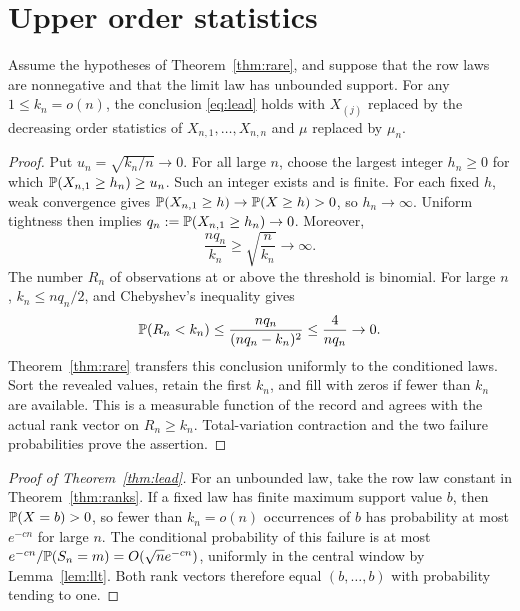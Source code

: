 \section{Upper order statistics}\label{sec:ranks}
\begin{theorem}\label{thm:ranks}
Assume the hypotheses of Theorem~\ref{thm:rare}, and suppose that the row laws are nonnegative and that the limit law has unbounded support. For any $1\le k_n=o(n)$, the conclusion \eqref{eq:lead} holds with $X_{(j)}$ replaced by the decreasing order statistics of $X_{n,1},\ldots,X_{n,n}$ and $\mu$ replaced by $\mu_n$.
\end{theorem}
\begin{proof}
Put $u_n=\sqrt{k_n/n}\to0$. For all large $n$, choose the largest integer $h_n\ge0$ for which $\mathbb P(X_{n,1}\ge h_n)\ge u_n$. Such an integer exists and is finite. For each fixed $h$, weak convergence gives $\mathbb P(X_{n,1}\ge h)\to\mathbb P(X\ge h)>0$, so $h_n\to\infty$. Uniform tightness then implies $q_n:=\mathbb P(X_{n,1}\ge h_n)\to0$. Moreover,
\begin{equation}\label{eq:enough}
 \frac{nq_n}{k_n}\ge\sqrt{\frac n{k_n}}\to\infty.
\end{equation}
The number $R_n$ of observations at or above the threshold is binomial. For large $n$, $k_n\le nq_n/2$, and Chebyshev's inequality gives
\[
 \mathbb P(R_n<k_n)\le\frac{nq_n}{(nq_n-k_n)^2}\le\frac4{nq_n}\to0.
\]
Theorem~\ref{thm:rare} transfers this conclusion uniformly to the conditioned laws. Sort the revealed values, retain the first $k_n$, and fill with zeros if fewer than $k_n$ are available. This is a measurable function of the record and agrees with the actual rank vector on $R_n\ge k_n$. Total-variation contraction and the two failure probabilities prove the assertion.
\end{proof}
\begin{proof}[Proof of Theorem~\ref{thm:lead}]
For an unbounded law, take the row law constant in Theorem~\ref{thm:ranks}. If a fixed law has finite maximum support value $b$, then $\mathbb P(X=b)>0$, so fewer than $k_n=o(n)$ occurrences of $b$ has probability at most $e^{-cn}$ for large $n$. The conditional probability of this failure is at most $e^{-cn}/\mathbb P(S_n=m)=O(\sqrt n e^{-cn})$, uniformly in the central window by Lemma~\ref{lem:llt}. Both rank vectors therefore equal $(b,\ldots,b)$ with probability tending to one.
\end{proof}

